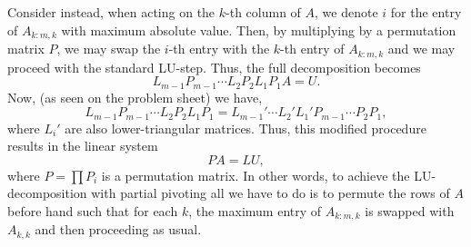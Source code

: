 \documentclass[
]{article}
\theoremstyle{definition}
\theoremstyle{definition}
\begin{document}
Consider instead, when acting on the \(k\)-th column of \(A\), we denote
\(i\) for the entry of \(A_{k:m, k}\) with maximum absolute value. Then,
by multiplying by a permutation matrix \(P\), we may swap the \(i\)-th
entry with the \(k\)-th entry of \(A_{k:m, k}\) and we may proceed with
the standard LU-step. Thus, the full decomposition becomes
\[L_{m - 1}P_{m -1} \cdots L_2 P_2 L_1 P_1 A = U.\] Now, (as seen on the
problem sheet) we have, \[L_{m - 1}P_{m -1} \cdots L_2 P_2 L_1 P_1 
  = L_{m - 1}' \cdots L_2' L_1' P_{m - 1} \cdots P_2 P_1,\] where
\(L_i'\) are also lower-triangular matrices. Thus, this modified
procedure results in the linear system \[PA = LU,\] where
\(P = \prod P_i\) is a permutation matrix. In other words, to achieve
the LU-decomposition with partial pivoting all we have to do is to
permute the rows of \(A\) before hand such that for each \(k\), the
maximum entry of \(A_{k:m, k}\) is swapped with \(A_{k, k}\) and then
proceeding as usual.
\end{document}
